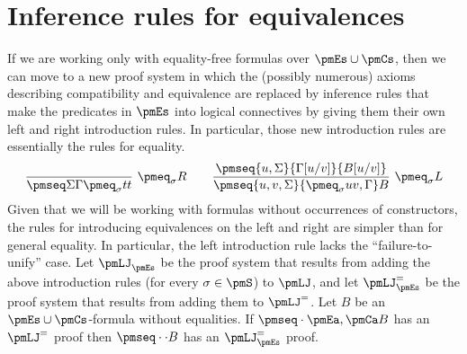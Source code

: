 \section*{Inference rules for equivalences}
If we are working only with equality-free formulas over $\pmEs\cup\pmCs$, then we can move to a new proof system in which the (possibly numerous) axioms describing compatibility and equivalence are replaced by inference rules that make the predicates in $\pmEs$ into logical connectives by giving them their own left and right introduction rules. In particular, those new introduction rules are essentially the rules for equality.
\[\frac{}{\pmseq\Sigma\Gamma{\pmeq_\sigma t t}}\ \pmeq_\sigma R\qquad
\frac{\pmseq{u,\Sigma}{\Gamma[u/v]}{B[u/v]}}{\pmseq{u,v,\Sigma}{\pmeq_\sigma u v,\Gamma}B}\ \pmeq_\sigma L\]
Given that we will be working with formulas without occurrences of constructors, the rules for introducing equivalences on the left and right are simpler than for general equality. In particular, the left introduction rule lacks the ``failure-to-unify'' case. Let $\pmLJ_{\pmEs}$ be the proof system that results from adding the above introduction rules (for every $\sigma\in\pmS$) to $\pmLJ$, and let $\pmLJ^=_{\pmEs}$ be the proof system that results from adding them to $\pmLJ^=$.
 Let $B$ be an $\pmEs\cup\pmCs$-formula without equalities. If $\pmseq\cdot{\pmEa,\pmCa}B$ has an $\pmLJ^=$ proof then $\pmseq\cdot\cdot B$ has an $\pmLJ^=_{\pmEs}$ proof.
